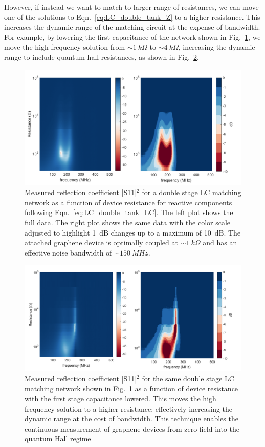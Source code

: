 However, if instead we want to match to larger range of resistances, we can move one of the solutions to Eqn.~\ref{eq:LC_double_tank_Z} to a higher resistance. This increases the dynamic range of the matching circuit at the expense of bandwidth. For example, by lowering the first capacitance of the network shown in Fig.~\ref{fig:S11vsR_double}, we move the high frequency solution from ${\sim}1~k\Omega$ to ${\sim}4~k\Omega$, increasing the dynamic range to include quantum hall resistances, as shown in Fig.~\ref{fig:S11vsR_double2}.
\begin{figure}
\centering
\includegraphics[width=\textwidth]{figures/Johnson_noise_thermometry/S11vsR_double.png}
\caption{Measured reflection coefficient |S11|$^2$ for a double stage LC matching network as a function of device resistance for reactive components following Eqn.~\ref{eq:LC_double_tank_LC}. The left plot shows the full data. The right plot shows the same data with the color scale adjusted to highlight 1~dB changes up to a maximum of 10~dB. The attached graphene device is optimally coupled at ${\sim}1~k\Omega$ and has an effective noise bandwidth of ${\sim}150~MHz$.}
\label{fig:S11vsR_double}
\end{figure}
\begin{figure}
\centering
\includegraphics[width=\textwidth]{figures/Johnson_noise_thermometry/S11vsR_double2.png}
\caption{Measured reflection coefficient |S11|$^2$ for the same  double stage LC matching network shown in Fig.~\ref{fig:S11vsR_double} as a function of device resistance with the first stage capacitance lowered. This moves the high frequency solution to a higher resistance; effectively increasing the dynamic range at the cost of bandwidth. This technique enables the continuous measurement of graphene devices from zero field into the quantum Hall regime}
\label{fig:S11vsR_double2}
\end{figure}

